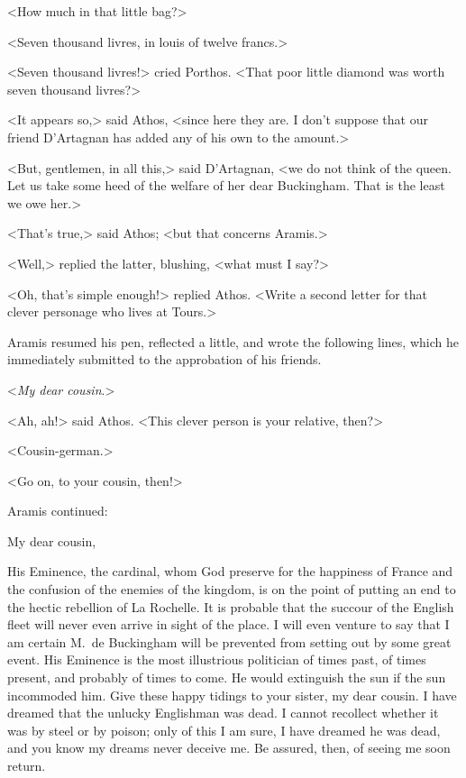 <How much in that little bag?> 

<Seven thousand livres, in louis of twelve francs.> 

<Seven thousand livres!> cried Porthos. <That poor little diamond was worth seven thousand livres?> 

<It appears so,> said Athos, <since here they are. I don't suppose that our friend D'Artagnan has added any of his own to the amount.> 

<But, gentlemen, in all this,> said D'Artagnan, <we do not think of the queen. Let us take some heed of the welfare of her dear Buckingham. That is the least we owe her.> 

<That's true,> said Athos; <but that concerns Aramis.> 

<Well,> replied the latter, blushing, <what must I say?> 

<Oh, that's simple enough!> replied Athos. <Write a second letter for that clever personage who lives at Tours.> 

Aramis resumed his pen, reflected a little, and wrote the following lines, which he immediately submitted to the approbation of his friends. 

<\textit{My dear cousin}.> 

<Ah, ah!> said Athos. <This clever person is your relative, then?> 

<Cousin-german.> 

<Go on, to your cousin, then!> 

Aramis continued: 

\begin{mail}{}{My dear cousin,}
	
His Eminence, the cardinal, whom God preserve for the happiness of France and the confusion of the enemies of the kingdom, is on the point of putting an end to the hectic rebellion of La Rochelle. It is probable that the succour of the English fleet will never even arrive in sight of the place. I will even venture to say that I am certain M.~de Buckingham will be prevented from setting out by some great event. His Eminence is the most illustrious politician of times past, of times present, and probably of times to come. He would extinguish the sun if the sun incommoded him. Give these happy tidings to your sister, my dear cousin. I have dreamed that the unlucky Englishman was dead. I cannot recollect whether it was by steel or by poison; only of this I am sure, I have dreamed he was dead, and you know my dreams never deceive me. Be assured, then, of seeing me soon return.
\end{mail}

